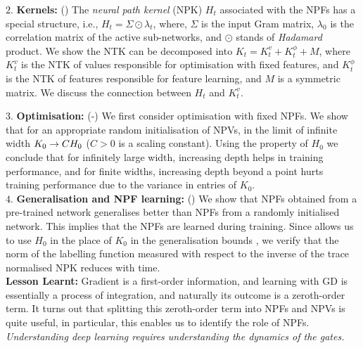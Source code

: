 $2.$ \textbf{Kernels:} () The \emph{neural path kernel} (NPK) $H_t$ associated with the NPFs has a special structure, i.e., $H_t=\Sigma\odot\lambda_t$, where, $\Sigma$ is the input Gram matrix, $\lambda_0$ is the correlation matrix of the active sub-networks, and $\odot$ stands of \emph{Hadamard} product.  We show the NTK can be decomposed into $K_t=K^v_t+K^{\phi}_t+M$, where $K^v_t$ is the NTK of values responsible for optimisation with fixed features, and $K^{\phi}_t$ is the NTK of features responsible for feature learning, and $M$ is a symmetric matrix. We discuss the connection between $H_t$ and $K^v_t$.\\
\begin{comment}$3.$ \textbf{Deep Gated Networks:} (\Cref{sec:optimisation}) We introduce the deep gated networks (DGN) framework, wherein, the gating values and hence the NPFs are held in a gating network and the NPVs are held in a value network (which is different from the gating network). The DGN framework enables us to study optimisation and generalisation properties of NPFs.\\
\end{comment}
$3.$ \textbf{Optimisation:} (-) We first consider optimisation with fixed NPFs. We show that for an appropriate random initialisation of NPVs, in the limit of infinite width $K_0\rightarrow CH_0$ ($C>0$ is a scaling constant). Using the property of $H_0$ we conclude that for infinitely large width, increasing depth helps in training performance, and for finite widths, increasing depth beyond a point hurts training performance due to the variance in entries of $K_0$.\\
$4.$ \textbf{Generalisation and NPF learning:} () We show that NPFs obtained from a pre-trained network generalises better than NPFs from a randomly initialised network. This implies that the NPFs are learned during training. Since  allows us to use $H_0$ in the place of $K_0$ in the generalisation bounds \cite{cao2019generalization}, we verify that the norm of the labelling function measured with respect to the inverse of the trace normalised NPK reduces with time.\\
\textbf{Lesson Learnt:} Gradient is a first-order information, and learning with GD is essentially a process of integration, and naturally its outcome is a zeroth-order term. It turns out that splitting this zeroth-order term into NPFs and NPVs is quite useful, in particular, this enables us to identify the role of NPFs. \emph{Understanding deep learning requires understanding the dynamics of the gates.}
